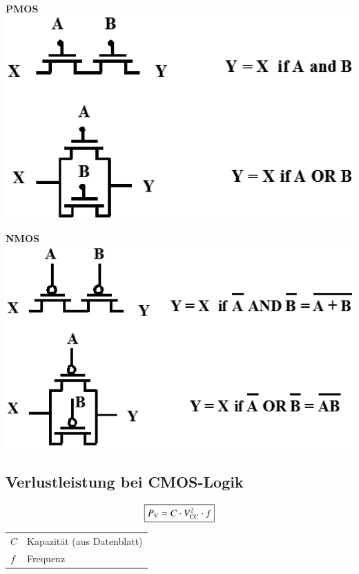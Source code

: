 \begin{minipage}[c]{0.45\columnwidth}
    \begin{center}
        \textbf{PMOS} \\
        \includegraphics[width=\columnwidth]{images/nmos_dualitaet.png}
    \end{center}
\end{minipage}
\hfill
\begin{minipage}[c]{0.45\columnwidth}
    \begin{center}
        \textbf{NMOS} \\
        \includegraphics[width=\columnwidth]{images/pmos_dualitaet.png}
    \end{center}
\end{minipage}


\subsection{Verlustleistung bei CMOS-Logik}

\begin{minipage}[c]{0.48\columnwidth}
    $$ \boxed{ P_V = C \cdot V_{\rm CC}^2 \cdot f} $$
\end{minipage}
\hfill
\begin{minipage}[c]{0.48\columnwidth}
    \begin{tabular}{ll}
        $C$ & Kapazität (aus Datenblatt) \\
        $f$ & Frequenz 
    \end{tabular}
\end{minipage}


